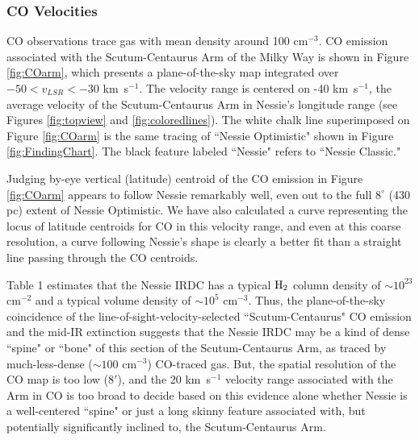\subsubsection{CO Velocities}
\label{CO}
CO observations trace gas with mean density around 100 cm$^{-3}$.   CO emission associated with the Scutum-Centaurus Arm of the Milky Way \citep{Dame2011}\citep{Dame2001} is shown in Figure \ref{fig:COarm}, which presents a plane-of-the-sky map integrated over  $-50 <v_{LSR}< -30$ km\ s$^{-1}$.  The velocity range is centered on -40 km\ s$^{-1}$, the average velocity of the Scutum-Centaurus Arm in Nessie's longitude range (see Figures \ref{fig:topview} and \ref{fig:coloredlines}).  The white chalk line superimposed on Figure \ref{fig:COarm} is the same tracing of ``Nessie Optimistic" shown in Figure \ref{fig:FindingChart}.  The black feature labeled ``Nessie" refers to ``Nessie Classic."   

Judging by-eye vertical (latitude) centroid of the CO emission in Figure \ref{fig:COarm} appears to follow Nessie remarkably well, even out to the full $8^\circ$ (430 pc) extent of Nessie Optimistic.  We have also calculated a curve representing the locus of latitude centroids for CO in this velocity range, and even at this coarse resolution, a curve following Nessie's shape is clearly a better fit than a straight line passing through the CO centroids. 

Table 1 estimates that the Nessie IRDC has a typical ${\rm H_2}$ column density of $\sim 10^{23}$ cm$^{-2}$ and a typical volume density of $\sim 10^5$ cm$^{-3}$.    Thus, the plane-of-the-sky coincidence of the line-of-sight-velocity-selected ``Scutum-Centaurus" CO emission  and the mid-IR extinction suggests that the Nessie IRDC may be a kind of dense ``spine" or ``bone" of this section of the Scutum-Centaurus Arm, as traced by much-less-dense ($\sim 100$ cm$^{-3}$) CO-traced gas.  But, the spatial resolution of the CO map is too low ($8'$), and the 20 km\ s$^{-1}$ velocity range associated with the Arm in CO is too broad to decide based on this evidence alone whether Nessie is a well-centered ``spine" or just a long skinny feature associated with, but potentially significantly inclined to, the Scutum-Centaurus Arm. 